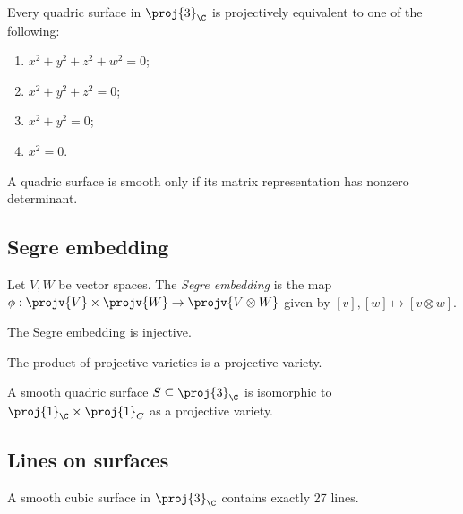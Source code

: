 \documentclass{article}
\begin{document}
\begin{theorem}
  Every quadric surface in $\proj{3}_{\C}$ is projectively equivalent to one of the following:
  \begin{enumerate}
    \item $x^2 + y^2 + z^2 + w^2 = 0$;
    \item $x^2 + y^2 + z^2 = 0$;
    \item $x^2 + y^2  = 0$;
    \item $x^2  = 0$.
  \end{enumerate}
\end{theorem}

\begin{corollary}
  A quadric surface is smooth only if its matrix representation has nonzero determinant.
\end{corollary}

\subsection{Segre embedding}

\begin{definition}
  Let $V,W$ be vector spaces. The \emph{Segre embedding} is the map
  $\phi:\projv{V}\times\projv{W} \to \projv{V\otimes W}$ given by
  $[v],[w]\mapsto [v\otimes w]$.
\end{definition}

\begin{proposition}
  The Segre embedding is injective.
\end{proposition}

\begin{corollary}
  The product of projective varieties is a projective variety.
\end{corollary}

\begin{proposition}
  A smooth quadric surface $S\subseteq\proj{3}_{\C}$ is isomorphic to $\proj{1}_{\C}\times\proj{1}_{C}$
  as a projective variety.
\end{proposition}

\subsection{Lines on surfaces}

\begin{theorem}
  A smooth cubic surface in $\proj{3}_{\C}$ contains exactly 27 lines.
\end{theorem}
\end{document}
